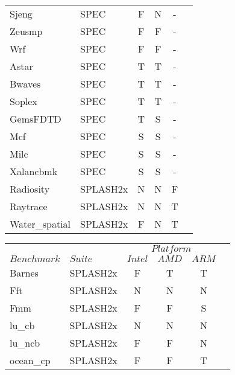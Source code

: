 \begin{landscape}
\begin{table}[htb]
{\begin{tabular}{@{}ll ccc c@{}}
        Sjeng       & SPEC    & F       & N     & -  \\   
        Zeusmp      & SPEC    & F       & F     & -  \\   
        Wrf         & SPEC    & F       & F     & -  \\   
        Astar       & SPEC    & T       & T     & -  \\   
        Bwaves      & SPEC    & T       & T     & -  \\   
        Soplex      & SPEC    & T       & T     & -  \\   
        GemsFDTD    & SPEC    & T       & S     & -  \\   
        Mcf         & SPEC    & S       & S     & -  \\   
        Milc        & SPEC    & S       & S     & -  \\   
        Xalancbmk   & SPEC    & S       & S     & -  \\   
        Radiosity   & SPLASH2x& N       & N     & F  \\   
        Raytrace    & SPLASH2x& N       & N     & T  \\   
        Water\_spatial& SPLASH2x& F       & N     & T\\   

        \bottomrule
        \end{tabular}
        \hspace{1em}
        \begin{tabular}{@{}ll ccc c@{}}  
        \toprule 
        & & \multicolumn{3}{c}{$Platform$}  \\
                \cmidrule{3-5}             
            $Benchmark$ & $Suite$ & $Intel$ & $AMD$ & $ARM$  \\
            \midrule
                                                                                                       
             Barnes      & SPLASH2x& F       & T     & T \\
             Fft         & SPLASH2x& N       & N     & N \\                                                 
             Fmm         & SPLASH2x& F       & F     & S \\                                                  
             lu\_cb      & SPLASH2x& N       & N     & N \\
             lu\_ncb     & SPLASH2x& F       & F     & N \\                                                  
             ocean\_cp   & SPLASH2x& F       & F     & T \\
                                                                                                              

\end{tabular}}
\end{table}
\end{landscape}
